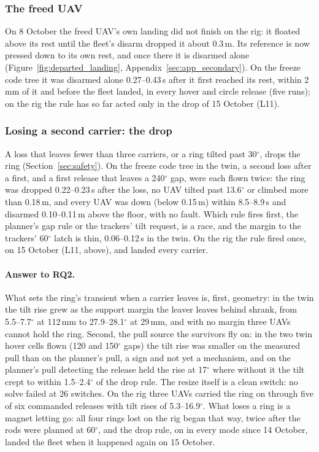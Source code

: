 

\subsubsection{The freed UAV}
\label{sec:res_freed}

On 8 October the freed UAV's own landing did not finish on the rig: it floated above its rest until the fleet's disarm
dropped it about 0.3\,m. Its reference is now pressed down to its own rest, and once there it is disarmed alone
(Figure~\ref{fig:departed_landing}, Appendix~\ref{sec:app_secondary}). On the freeze code tree it was disarmed alone
0.27--0.43\,s after it first reached its rest, within 2\,mm of it and before the fleet landed, in every hover and circle
release (five runs); on the rig the rule has so far acted only in the drop of 15 October (L11).

\subsubsection{Losing a second carrier: the drop}
\label{sec:res_drop}

A loss that leaves fewer than three carriers, or a ring tilted past 30$^\circ$, drops the ring
(Section~\ref{sec:safety}). On the freeze code tree in the twin, a second loss after a first, and a first release that
leaves a 240$^\circ$ gap, were each flown twice: the ring was dropped 0.22--0.23\,s after the loss, no UAV tilted past
13.6$^\circ$ or climbed more than 0.18\,m, and every UAV was down (below 0.15\,m) within 8.5--8.9\,s and disarmed
0.10--0.11\,m above the floor, with no fault. Which rule fires first, the planner's gap rule or the trackers' tilt request, is a race,
and the margin to the trackers' 60$^\circ$ latch is thin, 0.06--0.12\,s in the twin. On the rig the rule fired once, on 15 October (L11, above), and landed every carrier.

\paragraph{Answer to RQ2.} What sets the ring's transient when a carrier leaves is, first, geometry: in the twin the tilt
rise grew as the support margin the leaver leaves behind shrank, from 5.5--7.7$^\circ$ at 112\,mm to
27.9--28.1$^\circ$ at 29\,mm, and with no margin three UAVs cannot hold the ring. Second, the pull source the survivors
fly on: in the two twin hover cells flown (120 and 150$^\circ$ gaps) the tilt rise was smaller on the measured pull than
on the planner's pull, a sign and not yet a mechanism, and on the planner's pull detecting the release held the rise at
17$^\circ$ where without it the tilt crept to within 1.5--2.4$^\circ$ of the drop rule.
The resize itself is a clean switch: no solve failed at 26 switches. On the rig three UAVs carried the ring on through
five of six commanded releases with tilt rises of 5.3--16.9$^\circ$. What loses a ring is a magnet letting go: all four
rings lost on the rig began that way, twice after the rods were planned at 60$^\circ$, and the drop rule, on in every
mode since 14 October, landed the fleet when it happened again on 15 October.
